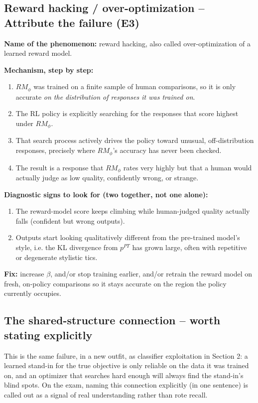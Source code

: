 \documentclass[11pt]{article}
\begin{document}
\subsection{Reward hacking / over-optimization -- Attribute the failure (E3)}
\textbf{Name of the phenomenon:} reward hacking, also called over-optimization of
a learned reward model.

\textbf{Mechanism, step by step:}
\begin{enumerate}
  \item $RM_\phi$ was trained on a finite sample of human comparisons, so it is
  only accurate \emph{on the distribution of responses it was trained on}.
  \item The RL policy is explicitly searching for the responses that score
  highest under $RM_\phi$.
  \item That search process actively drives the policy toward unusual,
  off-distribution responses, precisely where $RM_\phi$'s accuracy has never been
  checked.
  \item The result is a response that $RM_\phi$ rates very highly but that a
  human would actually judge as low quality, confidently wrong, or strange.
\end{enumerate}
\textbf{Diagnostic signs to look for (two together, not one alone):}
\begin{enumerate}
  \item The reward-model score keeps climbing while human-judged quality
  actually falls (confident but wrong outputs).
  \item Outputs start looking qualitatively different from the pre-trained
  model's style, i.e. the KL divergence from $p^{PT}$ has grown large, often with
  repetitive or degenerate stylistic tics.
\end{enumerate}
\textbf{Fix:} increase $\beta$, and/or stop training earlier, and/or retrain the
reward model on fresh, on-policy comparisons so it stays accurate on the region
the policy currently occupies.

\subsection{The shared-structure connection -- worth stating explicitly}
This is the same failure, in a new outfit, as classifier exploitation in
Section 2: a learned stand-in for the true objective is only reliable on the data
it was trained on, and an optimizer that searches hard enough will always find
the stand-in's blind spots. On the exam, naming this connection explicitly (in
one sentence) is called out as a signal of real understanding rather than rote
recall.
\end{document}
